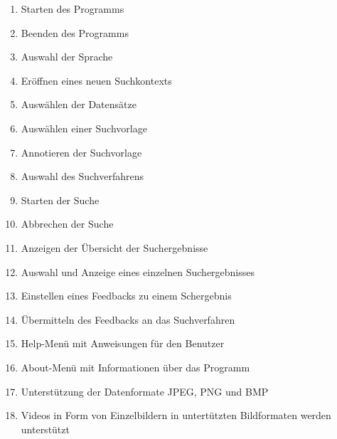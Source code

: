 \begin{enumerate} [label=\bfseries /F \arabic*0/]
	\subsection{Pflicht}
	\item Starten des Programms
	\item Beenden des Programms
	\item Auswahl der Sprache
	\item Er\"offnen eines neuen Suchkontexts
	\item Ausw\"ahlen der Datens\"atze
	\item Ausw\"ahlen einer Suchvorlage
	\item Annotieren der Suchvorlage
	\item Auswahl des Suchverfahrens
	\item Starten der Suche
	\item Abbrechen der Suche
	\item Anzeigen der \"Ubersicht der Suchergebnisse
	\item Auswahl und Anzeige eines einzelnen Suchergebnisses
	\item Einstellen eines Feedbacks zu einem Schergebnis
	\item \"Ubermitteln des Feedbacks an das Suchverfahren
	\item Help-Menü mit Anweisungen für den Benutzer
	\item About-Menü mit Informationen über das Programm
	\item Unterstützung der Datenformate JPEG, PNG und BMP
	\item Videos in Form von Einzelbildern in untert\"utzten Bildformaten werden unterst\"utzt

\end{enumerate}
